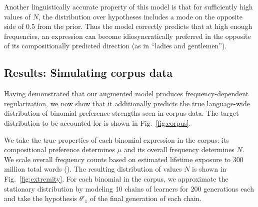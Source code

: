 \documentclass{evolang11}
\begin{document}
 Another linguistically accurate property of this model is that for sufficiently high values of $N$, the distribution over hypotheses includes a mode on the opposite side of 0.5 from the prior. Thus the model correctly predicts that at high enough frequencies, an expression can become idiosyncratically preferred in the opposite of its compositionally predicted direction (as in ``ladies and gentlemen'').
 

\subsection{Results: Simulating corpus data}\label{corpus}
Having demonstrated that our augmented model produces frequency-dependent regularization, we now show that it additionally predicts the true language-wide distribution of binomial preference strengths seen in corpus data. The target distribution to be accounted for is shown in Fig.\ \ref{fig:corpus}.


We take the true properties of each binomial expression in the corpus: its compositional preference determines $\mu$ and its overall frequency determines $N$. We scale overall frequency counts based on estimated lifetime exposure to 300 million total words (). The resulting distribution of values $N$ is shown in Fig.\ \ref{fig:extremity}. For each binomial in the corpus, we approximate the stationary distribution by modeling 10 chains of learners for 200 generations each and take the hypothesis $\theta'_1$ of the final generation of each chain.


\end{document}
